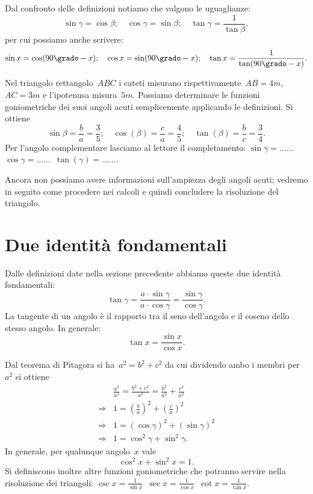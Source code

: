 Dal confronto delle definizioni notiamo che valgono le uguaglianze:
 \[\sin \gamma=\cos \beta;\quad \cos \gamma=\sin \beta;\quad \tan 
\gamma=\frac{1}{\tan \beta},\]
 per cui possiamo anche scrivere:
\[\sin x=\cos (90\grado-x);\quad \cos x=\sin (90\grado-x);\quad 
\tan x=\frac{1}{\tan(90\grado-x)}.\]

 \begin{esempio}
Nel triangolo rettangolo~\(ABC\) i cateti misurano 
rispettivamente~\(AB=4\unit{m}\), 
\(AC=3\unit{m}\) e l'ipotenusa misura~\(5\unit{m}\).
Possiamo determinare le funzioni goniometriche dei suoi angoli acuti 
semplicemente applicando le definizioni.
Si ottiene
\[\sin \beta =\frac{b}{a}=\frac{3}{5};\quad \cos (\beta 
)=\frac{c}{a}=\frac{4}{5};\quad \tan (\beta )=\frac{b}{c}=\frac{3}{4}.\]
Per l'angolo complementare lasciamo al lettore il completamento:
\(\sin \gamma =\ldots\ldots\)\quad~\(\cos \gamma 
=\ldots\ldots\)\quad~\(\tan(\gamma 
)=\ldots\ldots\)\quad.
 \end{esempio}

\osservazione Ancora non possiamo avere informazioni sull'ampiezza degli 
angoli 
acuti;
vedremo in seguito come procedere nei calcoli e quindi concludere la 
risoluzione 
del triangolo.


\section{Due identità fondamentali}
\label{sec:trigo_identita}

Dalle definizioni date nella sezione precedente abbiamo queste due identità 
fondamentali:
\[\tan \gamma=\frac{a\cdot \sin \gamma}{a\cdot \cos \gamma}=
\frac{\sin \gamma}{\cos \gamma}.\]
La tangente di un angolo è il rapporto tra il seno dell'angolo e il coseno 
dello 
stesso angolo. In generale:
 \begin{equation}
 \tan x=\frac{\sin x}{\cos x}.
 \end{equation}

Dal teorema di Pitagora si ha~\(a^{2}=b^{2}+c^{2}\) da cui dividendo ambo i 
membri 
per~\(a^{2}\) si ottiene
\begin{align*}
&\frac{a^{2}}{a^{2}}=\frac{b^{2}+c^{2}}{a^{2}}=
\frac{b^{2}}{a^{2}}+\frac{c^{2}}{a^{2}}\\
\Rightarrow & 1=\left(\frac{b}{a}\right)^{2}+\left(\frac{c}{a}\right)^{2}\\
\Rightarrow & 1=\left(\cos \gamma\right)^{2}+\left(\sin \gamma\right)^{2}\\
\Rightarrow & 1=\cos^{2} \gamma+\sin^{2} \gamma.
\end{align*}
In generale, per qualunque angolo~\(x\) vale
\begin{equation}
\label{eq:F.2}
 \cos^{2}x+\sin^{2}x=1.
\end{equation}
Si definiscono inoltre altre funzioni goniometriche che potranno servire 
nella 
risoluzione dei triangoli:
\(\csc x=\frac{1}{\sin x}\)\quad~\(\sec x=\frac{1}{\cos x}\)\quad~\(\cot x=
\frac{1}{\tan x}\).

